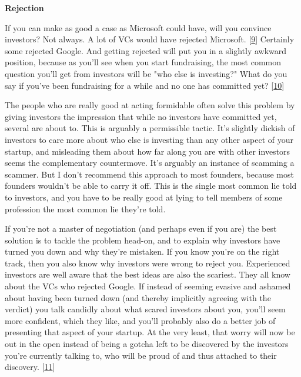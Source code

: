 \textbf{Rejection}

If you can make as good a case as Microsoft could
                  have, will you convince investors? Not always. A lot of VCs
                  would have rejected Microsoft.
                  [\href{\#f9n}{9}]
                  Certainly some rejected Google. And getting rejected will put
                  you in a slightly awkward position, because as you'll see when
                  you start fundraising, the most common question you'll get
                  from investors will be "who else is investing?" What do you
                  say if you've been fundraising for a while and no one has
                  committed yet?
                  [\href{\#f10n}{10}]

The people who are really good at acting
                  formidable often solve this problem by giving investors the
                  impression that while no investors have committed yet, several
                  are about to. This is arguably a permissible tactic. It's
                  slightly dickish of investors to care more about who else is
                  investing than any other aspect of your startup, and
                  misleading them about how far along you are with other
                  investors seems the complementary countermove. It's arguably
                  an instance of scamming a scammer. But I don't recommend this
                  approach to most founders, because most founders wouldn't be
                  able to carry it off. This is the single most common lie told
                  to investors, and you have to be really good at lying to tell
                  members of some profession the most common lie they're
                  told.

If you're not a master of negotiation (and
                  perhaps even if you are) the best solution is to tackle the
                  problem head-on, and to explain why investors have turned you
                  down and why they're mistaken. If you know you're on the right
                  track, then you also know why investors were wrong to reject
                  you. Experienced investors are well aware that the best ideas
                  are also the scariest. They all know about the VCs who
                  rejected Google. If instead of seeming evasive and ashamed
                  about having been turned down (and thereby implicitly agreeing
                  with the verdict) you talk candidly about what scared
                  investors about you, you'll seem more confident, which they
                  like, and you'll probably also do a better job of presenting
                  that aspect of your startup. At the very least, that worry
                  will now be out in the open instead of being a gotcha left to
                  be discovered by the investors you're currently talking to,
                  who will be proud of and thus attached to their discovery.
                  [\href{\#f11n}{11}]

